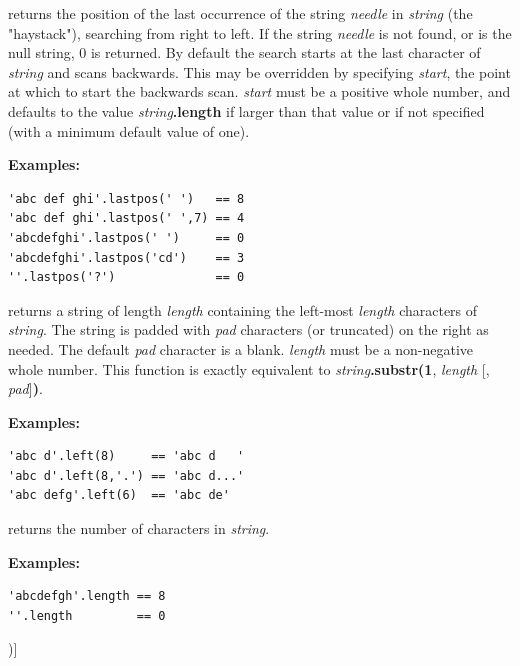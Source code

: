 \begin{description}
\item[lastpos(needle [,start{]})]\label{reflastpos}
returns the position of the last occurrence of the string
\emph{needle} in \emph{string} (the "haystack"), searching
from right to left.
If the string \emph{needle} is not found, or is the null string,
0 is returned.
By default the search starts at the last character of
\emph{string} and scans backwards.
This may be overridden by specifying \emph{start}, the point at
which to start the backwards scan.
\emph{start} must be a positive whole number, and defaults to the
value \emph{string}\textbf{.length} if larger than that
value or if not specified (with a minimum default value of one).
 
\textbf{Examples:}
\begin{lstlisting}
'abc def ghi'.lastpos(' ')   == 8
'abc def ghi'.lastpos(' ',7) == 4
'abcdefghi'.lastpos(' ')     == 0
'abcdefghi'.lastpos('cd')    == 3
''.lastpos('?')              == 0
\end{lstlisting}

\item[left(length [,pad{]})]\label{refleft}
returns a string of length \emph{length} containing the
left-most \emph{length} characters of \emph{string}.
The string is padded with \emph{pad} characters (or truncated) on
the right as needed.
The default \emph{pad} character is a blank.
\emph{length} must be a non-negative whole number.
This function is exactly equivalent to
\emph{string}\textbf{.substr(1}, \emph{length}
[, \emph{pad}]\textbf{)}.
 
\textbf{Examples:}
\begin{lstlisting}
'abc d'.left(8)     == 'abc d   '
'abc d'.left(8,'.') == 'abc d...'
'abc defg'.left(6)  == 'abc de'
\end{lstlisting}

\item[length()]\label{reflength}
returns the number of characters in \emph{string}.
 
\textbf{Examples:}
\begin{lstlisting}
'abcdefgh'.length == 8
''.length         == 0
\end{lstlisting}
\item[lower([n [,length{]}])]\label{reflower}


\end{description}
